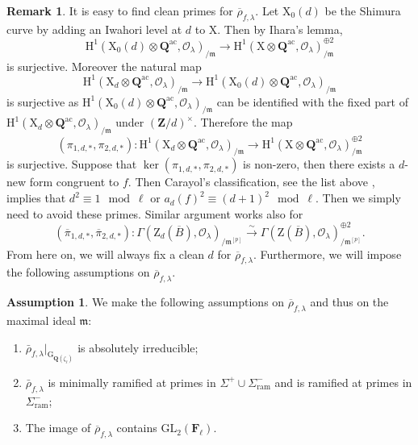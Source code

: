 \documentclass[10pt]{amsart}
\newcommand*\Z{\mathds{Z}}
\newcommand*\ZZ{|[draw,circle]| \Z_2}
\numberwithin{equation}{section}
\theoremstyle{plain}
\numberwithin{equation}{section}
\theoremstyle{definition}
\newtheorem{assumption}[theorem]{Assumption}
\newtheorem{remark}[equation]{Remark}
\theoremstyle{remark}
\def\GL{\mathrm{GL}}
\def\ac{\mathrm{ac}}
\def\frakm{\mathfrak{m}}
\def\ac{\mathrm{ac}}
\def\ram{\mathrm{ram}}
\def\calO{\mathcal{O}}
\def\frakm{\mathfrak{m}}
\def\FF{\mathbf{F}}
\def\QQ{\mathbf{Q}}
\def\ZZ{\mathbf{Z}}
\def\rmG{\mathrm{G}}
\def\rmH{\mathrm{H}}
\def\rmX{\mathrm{X}}
\def\rmZ{\mathrm{Z}}
\begin{document}
\begin{remark}
It is easy to find clean primes for $\overline{\rho}_{f,\lambda}$. Let $\rmX_{0}(d)$ be the Shimura curve by adding an  Iwahori level at $d$ to $\rmX$. Then by Ihara's lemma, 
\begin{equation*}
\rmH^{1}(\rmX_{0}(d)\otimes\QQ^{\ac},\calO_{\lambda})_{/\frakm}\rightarrow  \rmH^{1}(\rmX\otimes{\QQ^{\ac}},\calO_{\lambda})^{\oplus 2}_{/\frakm} 
\end{equation*}
is surjective. Moreover the natural map 
\begin{equation*}
\rmH^{1}(\rmX_{d}\otimes\QQ^{\ac},\calO_{\lambda})_{/\frakm}\rightarrow\rmH^{1}(\rmX_{0}(d)\otimes\QQ^{\ac},\calO_{\lambda})_{/\frakm} 
\end{equation*}
is surjective as $\rmH^{1}(\rmX_{0}(d)\otimes\QQ^{\ac},\calO_{\lambda})_{/\frakm}$ can be identified with the fixed part of $\rmH^{1}(\rmX_{d}\otimes\QQ^{\ac},\calO_{\lambda})_{/\frakm}$ under $(\ZZ/d)^{\times}$. Therefore the map
\begin{equation*}
(\pi_{1,d,\ast}, \pi_{2,d,\ast}): \rmH^{1}(\rmX_{d}\otimes\QQ^{\ac},\calO_{\lambda})_{/\frakm}\rightarrow \rmH^{1}(\rmX\otimes{\QQ^{\ac}},\calO_{\lambda})^{\oplus 2}_{/\frakm} 
\end{equation*}
is surjective.  Suppose that $\ker(\pi_{1,d, \ast}, \pi_{2,d, \ast})$ is non-zero, then there exists a $d$-new form congruent to $f$. Then Carayol's classification, see the list above \cite[Theorem A]{DT}, implies that $d^{2}\equiv 1\mod \ell$ or $a_{d}(f)^{2}\equiv(d+1)^{2}\mod \ell$. Then we simply need to avoid these primes. Similar argument works also for 
\begin{equation*}
(\overline{\pi}_{1,d, \ast}, \overline{\pi}_{2,d, \ast}): \Gamma(\rmZ_{d}(\overline{B}),\calO_{\lambda})_{/\frakm^{[p]}}\xrightarrow{\sim}  \Gamma(\rmZ(\overline{B}),\calO_{\lambda})^{\oplus 2}_{/\frakm^{[p]}}.
\end{equation*}
From here on, we will always fix a clean $d$ for $\overline{\rho}_{f,\lambda}$. Furthermore, we will impose the following assumptions on $\overline{\rho}_{f,\lambda}$.
\end{remark}

\begin{assumption}\label{assump}
We make the following assumptions on $\overline{\rho}_{f, \lambda}$ and thus on the maximal ideal $\frakm$:
\begin{enumerate}
\item $\bar{\rho}_{f, \lambda}\vert_{\rmG_{\QQ(\zeta_{\ell})}}$ is absolutely irreducible;
\item $\bar{\rho}_{f, \lambda}$ is minimally ramified at primes in $\Sigma^{+}\cup\Sigma^{-}_{\ram}$ and is ramified at primes in $\Sigma^{-}_{\ram}$;
\item The image of $\overline{\rho}_{f, \lambda}$ contains $\GL_{2}(\FF_{\ell})$.
\end{enumerate}
\end{assumption}
\end{document}
